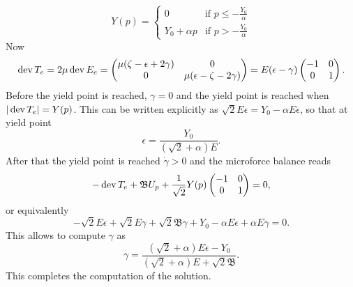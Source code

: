 \[
Y(p)=
\begin{cases}
0 & \text{if $p\le-\frac{Y_0}{\alpha}$} \\
Y_0+\alpha p & \text{if $p>-\frac{Y_0}{\alpha}$}
\end{cases}
\]
Now
\[
\operatorname{dev} T_e=2\mu\operatorname{dev} E_e=
\begin{pmatrix}
\mu(\zeta-\epsilon+2\gamma) & 0 \\
0 & \mu(\epsilon-\zeta-2\gamma)
\end{pmatrix}=
E(\epsilon-\gamma)\begin{pmatrix}
-1 & 0 \\
0 & 1
\end{pmatrix}.
\]
Before the yield point is reached, $\gamma=0$ and the yield point is reached when $|\operatorname{dev} T_e|=Y(p)$. This can be written explicitly as $\sqrt{2}E\epsilon=Y_0-\alpha E\epsilon$, so that at yield point
\[
\epsilon=\frac{Y_0}{(\sqrt{2}+\alpha)E}.
\]
After that the yield point is reached $\dot\gamma>0$ and the microforce balance reads
\[
-\operatorname{dev} T_e+\mathfrak{B}U_p+\frac{1}{\sqrt{2}}Y(p)\begin{pmatrix}
-1 & 0 \\
0 & 1
\end{pmatrix}=0,
\]
or equivalently
\[
-\sqrt{2}E\epsilon+\sqrt{2}E\gamma+\sqrt{2}\mathfrak{B}\gamma+Y_0-\alpha E\epsilon+\alpha E\gamma=0.
\]
This allows to compute $\gamma$ as
\[
\gamma=\frac{(\sqrt{2}+\alpha)E\epsilon-Y_0}{(\sqrt{2}+\alpha)E+\sqrt{2}\mathfrak{B}}.
\]
This completes the computation of the solution.